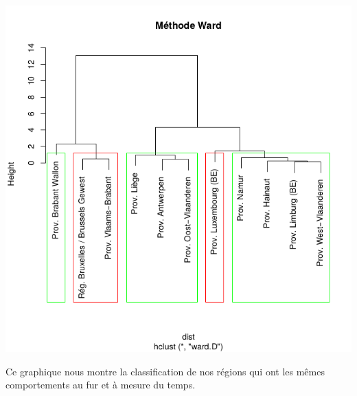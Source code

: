 \documentclass{article}
\begin{document}
	\includegraphics[width=\textwidth]{Ward}
	
	Ce graphique nous montre la classification de nos régions qui ont les mêmes comportements au fur et à mesure du temps.
\end{document}
